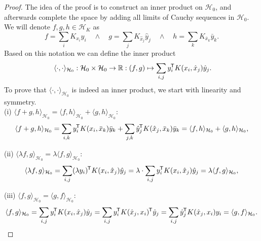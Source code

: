 \documentclass[11pt, a4paper]{article}
\newcommand{\R}{\mathbb{R}}
\renewcommand{\H}{\mathcal{H}}
\newcommand*{\tr}{^{\mkern-1.5mu\mathsf{T}}}
\begin{document}
\begin{proof}
The idea of the proof is to construct an inner product on $\H_0$, and afterwards complete the space by adding all limits of Cauchy sequences in $\H_0$. We will denote  $f,g,h \in \H_K$ as
\[ f = \sum_{i} K_{x_i}y_i \quad \wedge \quad g = \sum_{j} K_{\hat{x}_j}\hat{y}_j \quad \wedge \quad h = \sum_{k} K_{\bar{x}_k}\bar{y}_k. \]
Based on this notation we can define the inner product 
\[ \langle \cdot, \cdot \rangle_{\H_0} : \H_0 \times \H_0 \to \R : (f,g) \mapsto \sum_{i,j} y_i \tr K(x_i, \hat{x}_j) \hat{y}_j. \]
To prove that $\langle \cdot, \cdot \rangle_{\H_0}$ is indeed an inner product, we start with linearity and symmetry. \\

(i) $\langle f + g , h \rangle_{\H_0} = \langle f , h \rangle_{\H_0} + \langle g , h \rangle_{\H_0}$:
\[ \langle f + g , h \rangle_{\H_0} = \sum_{i,k} y_i \tr K(x_i, \bar{x}_k) \bar{y}_k +  \sum_{j,k} \hat{y}_j \tr K(\hat{x}_j, \bar{x}_k) \bar{y}_k = \langle f , h \rangle_{\H_0} + \langle g , h \rangle_{\H_0}, \]

(ii) $\langle \lambda f , g \rangle_{\H_0} = \lambda \langle f, g \rangle_{\H_0}$:
\[ \langle \lambda f , g \rangle_{\H_0} = \sum_{i,j} (\lambda y_i) \tr K(x_i, \hat{x}_j) \hat{y}_j = \lambda \cdot \sum_{i,j} y_i \tr K(x_i, \hat{x}_j) \hat{y}_j = \lambda \langle f, g \rangle_{\H_0},  \]

(iii) $\langle f , g \rangle_{\H_0} = \langle g , f \rangle_{\H_0}$:
\[ \langle f , g \rangle_{\H_0} = \sum_{i,j} y_i \tr K(x_i, \hat{x}_j) \hat{y}_j = \sum_{i,j} y_i \tr K(\hat{x}_j,x_i) \tr \hat{y}_j = \sum_{i,j} \hat{y}_j \tr K(\hat{x}_j, x_i) y_i = \langle g , f \rangle_{\H_0}. \]


\end{proof}
\end{document}
